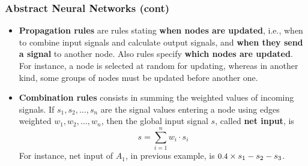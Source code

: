 \documentclass[compress,dvipdfmx]{beamer}
\begin{document}
%
\begin{frame}
\frametitle{Abstract Neural Networks (cont)}

\begin{itemize}

  \item \textbf{Propagation rules} are rules stating \textbf{when
    nodes are updated}, i.e., when to combine input signals and
  calculate output signals, and \textbf{when they send a signal} to
  another node. Also rules specify \textbf{which nodes are
    updated}. For instance, a node is selected at random for updating,
  whereas in another kind, some groups of nodes must be updated before
  another one.

  \item \textbf{Combination rules} consists in summing the
  weighted values of incoming signals. If $s_1, s_2, \dots, s_n$ are
  the signal values entering a node using edges weighted $w_1, w_2,
  \dots, w_n$, then the global input signal $s$, called \textbf{net
  input}, is \[s = \sum_{i=1}^{n}{w_i \cdot s_i}\] For
  instance, net input of $A_1$, in previous example, is \(\text{\small
  0.4} \times s_1 - s_2 - s_3\).

\end{itemize}

\end{frame}
\end{document}
